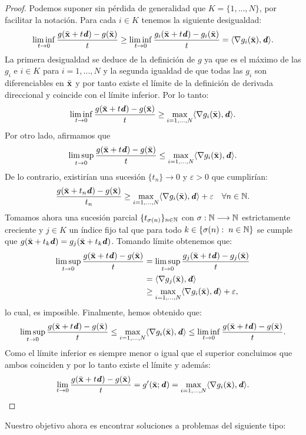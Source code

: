 	\begin{proof}
		Podemos suponer sin pérdida de generalidad que $ K = \{1, ..., N \} $, por facilitar la notación. Para cada $ i \in K $ tenemos la siguiente desigualdad:
		\begin{equation*}
			\liminf_{t\rightarrow0}\frac{g(\bar{\mathbf{x}}+t\textbf{\emph{d}}) - g(\bar{\mathbf{x}})}{t} \geq \liminf_{t\rightarrow0}\frac{g_i(\bar{\mathbf{x}}+t\textbf{\emph{d}}) - g_i(\bar{\mathbf{x}})}{t} = \langle \nabla g_i(\bar{\mathbf{x}}), \textbf{\emph{d}} \rangle.
		\end{equation*}	
		La primera desigualdad se deduce de la definición de $ g $ ya que es el máximo de las $ g_i $ e $ i \in K $ para $ i=1,...,N$ y la segunda igualdad de que todas las $ g_i $ son diferenciables en $ \bar{\mathbf{x}} $ y por tanto existe el límite de la definición de derivada direccional y coincide con el límite inferior. Por lo tanto:
		\[
		\liminf_{t\rightarrow0}\frac{g(\bar{\mathbf{x}}+t\textbf{\emph{d}}) - g(\bar{\mathbf{x}})}{t} \geq \max_{i=1,...,N}\langle \nabla g_i(\bar{\mathbf{x}}), \textbf{\emph{d}} \rangle.
		\]
		Por otro lado, afirmamos que 
		\begin{equation*}
			\limsup_{t\rightarrow0}\frac{g(\bar{\mathbf{x}}+t\textbf{\emph{d}}) - g(\bar{\mathbf{x}})}{t} \leq \max_{i=1,...,N}\langle \nabla g_i(\bar{\mathbf{x}}), \textbf{\emph{d}} \rangle.
		\end{equation*}
		De lo contrario, existirían una sucesión $ \{t_n\}\rightarrow 0 $ y $ \varepsilon > 0 $ que cumplirían:
		\[
		\frac{g(\bar{\mathbf{x}}+t_n \textbf{\emph{d}}) - g(\bar{\mathbf{x}})}{t_n} \geq \max_{i=1,...,N}\langle \nabla g_i(\bar{\mathbf{x}}), \textbf{\emph{d}} \rangle + \varepsilon \quad \forall n \in \mathbb{N}.
		\]
		Tomamos ahora una sucesión parcial $ \{t_{\sigma(n)}\}_{n \in \mathbb{N}} $ con $ \sigma:\mathbb{N} \longrightarrow \mathbb{N} $ estrictamente creciente y $ j \in K $ un índice fijo tal que para todo $ k \in \{\sigma(n): \hspace{1mm} n\in \mathbb{N}\} $ se cumple que $ g(\bar{\mathbf{x}} + t_k \textbf{\emph{d}}) = g_j (\bar{\mathbf{x}} + t_k \textbf{\emph{d}})$. Tomando límite obtenemos que:
		\begin{equation*}
		\begin{split}
		\limsup_{t\rightarrow0}\frac{g(\bar{\mathbf{x}}+t\textbf{\emph{d}}) - g(\bar{\mathbf{x}})}{t} &= 	\limsup_{t\rightarrow0}\frac{g_j(\bar{\mathbf{x}}+t\textbf{\emph{d}}) - g_j(\bar{\mathbf{x}})}{t} \\
		&= \langle \nabla g_j(\bar{\mathbf{x}}), \textbf{\emph{d}} \rangle \\ &\geq \max_{i=1,...,N}\langle \nabla g_i(\bar{\mathbf{x}}), \textbf{\emph{d}} \rangle + \varepsilon,
		\end{split}
		\end{equation*}
		lo cual, es imposible. Finalmente, hemos obtenido que:
		\[
		\limsup_{t\rightarrow0}\frac{g(\bar{\mathbf{x}}+t\textbf{\emph{d}}) - g(\bar{\mathbf{x}})}{t} \leq \max_{i=1,...,N}\langle \nabla g_i(\bar{\mathbf{x}}), \textbf{\emph{d}} \rangle \leq 	\liminf_{t\rightarrow0}\frac{g(\bar{\mathbf{x}}+t\textbf{\emph{d}}) - g(\bar{\mathbf{x}})}{t}.
		\]
		Como el límite inferior es siempre menor o igual que el superior concluimos que ambos coinciden y por lo tanto existe el límite y además:
		\[
		\lim_{t\rightarrow0}\frac{g(\bar{\mathbf{x}}+t\textbf{\emph{d}}) - g(\bar{\mathbf{x}})}{t} = g'(\bar{\mathbf{x}};\textbf{\emph{d}}) = \max_{i=1,...,N}\langle \nabla g_i(\bar{\mathbf{x}}), \textbf{\emph{d}} \rangle.
		\]
	\end{proof}
\bigskip
	Nuestro objetivo ahora es encontrar soluciones a problemas del siguiente tipo:
	

